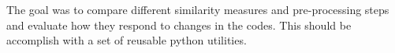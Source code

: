 
The goal was to compare different similarity measures and pre-processing steps and evaluate how
they respond to changes in the codes.
This should be accomplish with a set of reusable python utilities.
